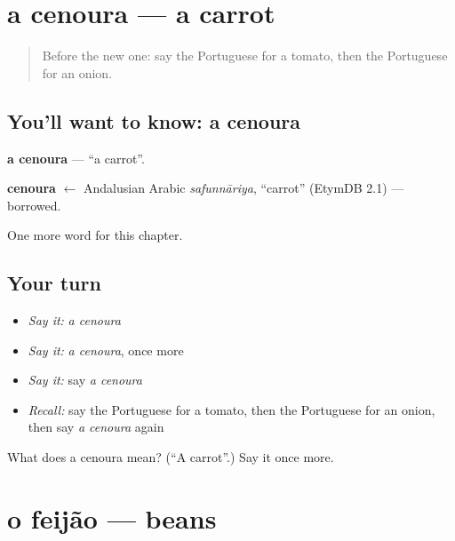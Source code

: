\section[a cenoura]{a cenoura — a carrot}

\label{lesson:PT-C46-cenoura}



\begin{quote}
Before the new one: say the Portuguese for a tomato, then the Portuguese for an onion.
\end{quote}

\subsection*{You'll want to know: a cenoura}
\textbf{a cenoura} — \textquotedblleft{}a carrot\textquotedblright{}.

\begin{cousinweb}
\textbf{cenoura} $\leftarrow$ Andalusian Arabic \emph{safunnāriya}, \textquotedblleft{}carrot\textquotedblright{} (EtymDB 2.1) — borrowed.
\end{cousinweb}

\begin{grammarlens}[title={What you've built}]
One more word for this chapter.
\end{grammarlens}

\subsection*{Your turn}
\begin{itemize}
\raggedright
  \item \emph{Say it:} \emph{a cenoura}
  \item \emph{Say it:} \emph{a cenoura}, once more
  \item \emph{Say it:} say \emph{a cenoura}
  \item \emph{Recall:} say the Portuguese for a tomato, then the Portuguese for an onion, then say \emph{a cenoura} again
\end{itemize}

\begin{tcolorbox}[breakable,colback=teal!4,colframe=teal!35!black,title={Before you move on}]
What does a cenoura mean? (\textquotedblleft{}A carrot\textquotedblright{}.) Say it once more.
\end{tcolorbox}
\section[o feijão]{o feijão — beans}

